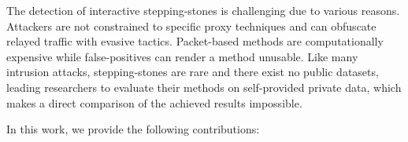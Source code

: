 \documentclass[runningheads,11pt]{llncs}\usepackage[]{graphicx}\usepackage[]{color}
\begin{document}




The detection of interactive stepping-stones is challenging due to various reasons. Attackers are not constrained to specific proxy techniques and can obfuscate relayed traffic with  evasive tactics. Packet-based methods are computationally expensive while false-positives can render a method unusable. Like many intrusion attacks, stepping-stones are rare and there exist no public datasets, leading researchers to evaluate their methods on self-provided private data, which makes a direct comparison of the achieved results impossible.



In this work, we provide the following contributions:
\end{document}
